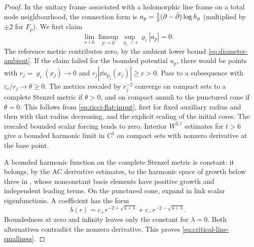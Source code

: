 \begin{proof}
In the unitary frame associated with a holomorphic line
frame on a total node neighbourhood, the connection form
is $a_p=\tfrac12(\partial-\bar\partial)\log h_p$ (multiplied by
$\pm2$ for $F_p$). We first claim
\begin{equation}\label{eq:critical-line-smallness}
 \lim_{s\downarrow0}\limsup_{p\to0}
       \sup_{\varrho_i<s}\varrho_i|a_p|=0.
\end{equation}
The reference metric contributes zero, by the ambient lower
bound \eqref{eq:diameter-ambient}. If the claim failed for
the bounded potential $u_p$, there would be points with
$r_j=\varrho_i(x_j)\to0$ and $r_j|\dd u_{p_j}(x_j)|\ge c>0$.
Pass to a subsequence with $\varepsilon_i/r_j\to\theta\ge0$.
The metrics rescaled by $r_j^{-2}$ converge on compact sets
to a complete Stenzel metric if $\theta>0$, and on compact
annuli to the punctured cone if $\theta=0$.
This follows from \eqref{eq:ricci-flat-input}, first for
fixed auxiliary radius and then with that radius decreasing,
and the explicit scaling of the initial cores. The rescaled
bounded scalar forcing tends to zero. Interior $W^{2,t}$
estimates for $t>6$ give a bounded harmonic limit in $C^1$
on compact sets with nonzero derivative at the base point.

A bounded harmonic function on the complete Stenzel metric
is constant: it belongs, by the AC derivative estimates,
to the harmonic space of growth below three in
\cite[Lemma 6.1]{W_Hodge}, whose nonconstant basis elements
have positive growth and independent leading terms.
On the punctured cone, expand in link scalar eigenfunctions.
A coefficient has the form
\[
 b(r)=c_+r^{-2+\sqrt{4+\lambda}}
                         +c_-r^{-2-\sqrt{4+\lambda}}.
\]
Boundedness at zero and infinity leaves only the constant
for $\lambda=0$. Both alternatives contradict the nonzero
derivative. This proves \eqref{eq:critical-line-smallness}.


\end{proof}
